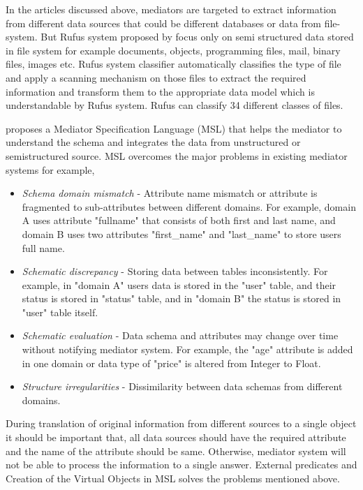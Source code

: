 	In the articles discussed above, mediators are targeted to extract information from different data sources that could be different databases or data from file-system. But Rufus system proposed by \citet{shoens1993rufus} focus only on semi structured data stored in file system for example documents, objects, programming files, mail, binary files, images etc. Rufus system classifier automatically classifies the type of file and apply a scanning mechanism on those files to extract the required information and transform them to the appropriate data model which is understandable by Rufus system. Rufus can classify 34 different classes of files.
	
	\citet{papakonstantinou1996medmaker} proposes a Mediator Specification Language (MSL) that helps the mediator to understand the schema and integrates the data from unstructured or semistructured source. MSL overcomes the major problems in existing mediator systems for example,
	\begin{itemize}
		\item \emph{Schema domain mismatch} - Attribute name mismatch or attribute is fragmented to sub-attributes between different domains. For example, domain A uses attribute "fullname" that consists of both first and last name, and domain B uses two attributes "first\_name" and "last\_name" to store users full name.
		\item \emph{Schematic discrepancy} - Storing data between tables inconsistently. For example, in "domain A" users data is stored in the "user" table, and their status is stored in "status" table, and in "domain B" the status is stored in "user" table itself.
		\item \emph{Schematic evaluation} - Data schema and attributes may change over time without notifying mediator system. For example, the "age" attribute is added in one domain or data type of "price" is altered from Integer to Float.
		\item \emph{Structure irregularities} - Dissimilarity between data schemas from different domains.
	\end{itemize}
	
	During translation of original information from different sources to a single object it should be important that, all data sources should have the required attribute and the name of the attribute should be same. Otherwise, mediator system will not be able to process the information to a single answer.  External predicates and Creation of the Virtual Objects in MSL solves the problems mentioned above.
	
